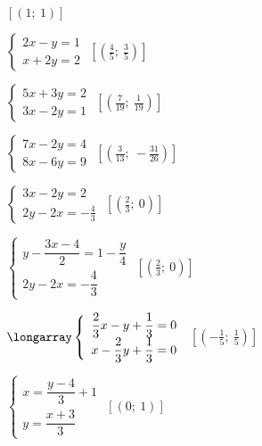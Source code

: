 \begin{esercizio}[\Ast]
\begin{multicols}{2}
\begin{enumeratea}
 \hfill \(\left[(1;~1)\right]\)
\item \(\left\{\begin{array}{l}2x-y=1 \\x+2y=2\end{array}\right.\)
 \hfill \(\left[\left(\frac{4}{5};~\frac{3}{5}\right)\right]\)
\item \(\left\{\begin{array}{l}5x+3y=2 \\3x-2y=1\end{array}\right.\)
 \hfill \(\left[\left(\frac{7}{19};~\frac{1}{19}\right)\right]\)
\item \(\left\{\begin{array}{l}7x-2y=4\\8x-6y=9 \end{array}\right.\)
 \hfill \(\left[\left(\frac{3}{13};~-\frac{31}{26}\right)\right]\)
\item \(\left\{\begin{array}{l}3x-2y=2\\2y-2x=-{\frac{4}{3}} 
\end{array}\right.\)
 \hfill \(\left[(\frac{2}{3};~0)\right]\)
\item \(\left\{\begin{array}{l}
y-\dfrac{3x-4}{2}=1-\dfrac{y}{4}\\
2y-2x=-{\dfrac{4}{3}}\end{array}\right.\)
 \hfill \(\left[\left(\frac{2}{3};~0\right)\right]\)
\item \(\longarray\left\{\begin{array}{l}
\dfrac{2}{3}x-y+\dfrac{1}{3}=0\\
x-\dfrac{2}{3}y+\dfrac{1}{3}=0\end{array}\right.\)
 \hfill \(\left[\left(-{\frac{1}{5}};~\frac{1}{5}\right)\right]\)
\item \(\left\{\begin{array}{l}
x=\dfrac{y-4}{3}+1\\
y=\dfrac{x+3}{3}\end{array}\right.\)
 \hfill \(\left[(0;~1)\right]\)
\end{enumeratea}
\end{multicols}
\end{esercizio}

